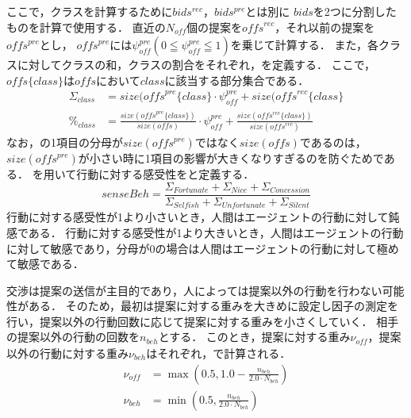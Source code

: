ここで，クラスを計算するために$bids^{rec}$，$bids^{pre}$とは別に
$bids$を2つに分割したものを計算で使用する．
直近の$N_{\mathit{off}}$個の提案を$\mathit{offs}^{rec}$，それ以前の提案を$\mathit{offs}^{pre}$とし，
$\mathit{offs}^{pre}$には$\psi_{\mathit{off}}^{pre}(0 \leqq \psi_{\mathit{off}}^{pre} \leqq 1)$を乗じて計算する．
また，各クラスに対してクラスの和，クラスの割合をそれぞれ，を定義する．
ここで，$\mathit{offs}\{class\}$は$\mathit{offs}$において$class$に該当する部分集合である．
\begin{align}
    \Sigma_{class} &= size(\mathit{offs}^{pre}\{class\} \cdot \psi_{\mathit{off}}^{pre} + size(\mathit{offs}^{rec}\{class\} \label{eq:classSum} \\
    \%_{class} &= \frac{size(\mathit{offs}^{pre}\{class\})}{size(\mathit{offs})} \cdot \psi_{\mathit{off}}^{pre} + \frac{size(\mathit{offs^{rec}}\{class\})}{size(\mathit{offs}^{rec})} 
    \label{eq:classRate}
\end{align}
なお，の1項目の分母が$size(\mathit{offs}^{pre})$ではなく$size(\mathit{offs})$であるのは，
$size(\mathit{offs}^{pre})$が小さい時に1項目の影響が大きくなりすぎるのを防ぐためである．
を用いて行動に対する感受性をと定義する．
\begin{equation}
    senseBeh = \frac{\Sigma_{Fortunate} + \Sigma_{Nice} + \Sigma_{Concession}}{\Sigma_{\mathit{Selfish}} + \Sigma_{\mathit{Unfortunate}} + \Sigma_{Silent}} 
    \label{eq:sensebeh}
\end{equation}
行動に対する感受性が1より小さいとき，人間はエージェントの行動に対して鈍感である．
行動に対する感受性が1より大きいとき，人間はエージェントの行動に対して敏感であり，分母が0の場合は人間はエージェントの行動に対して極めて敏感である．

交渉は提案の送信が主目的であり，人によっては提案以外の行動を行わない可能性がある．
そのため，最初は提案に対する重みを大きめに設定し因子の測定を行い，提案以外の行動回数に応じて提案に対する重みを小さくしていく．
相手の提案以外の行動の回数を$n_{beh}$とする．
このとき，提案に対する重み$\nu_{\mathit{off}}$，提案以外の行動に対する重み$\nu_{beh}$はそれぞれ，で計算される．
\begin{align}
    \nu_{\mathit{off}} &= \max \left( 0.5, 1.0 - \frac{n_{beh}}{2.0 \cdot N_{beh}} \right) \label{eq:offW} \\
    \nu_{beh} &= \min \left( 0.5, \frac{n_{beh}}{2.0 \cdot N_{beh}} \right) \label{eq:behW} 
\end{align}

